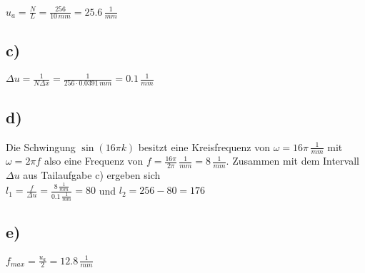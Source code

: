 \documentclass[a4paper,11pt,oneside]{scrartcl}
\begin{document}
$u_{a}=\frac{N}{L}=\frac{256}{10\,mm}=25.6\,\frac{1}{mm}$

\subsection*{c)}

$\Delta u=\frac{1}{N\Delta x}=\frac{1}{256\cdot0.0391\,mm}= 0.1\,\frac{1}{mm}$

\subsection*{d)}

Die Schwingung $\sin(16\pi k)$ besitzt eine Kreisfrequenz von $\omega=16\pi\,\frac{1}{mm}$ mit $\omega=2\pi f$ also eine Frequenz von $f=\frac{16\pi}{2\pi}\,\frac{1}{mm}=8\,\frac{1}{mm}$. Zusammen mit dem Intervall $\Delta u$ aus Tailaufgabe c) ergeben sich \\

$l_{1}=\frac{f}{\Delta u}=\frac{8\,\frac{1}{mm}}{0.1\,\frac{1}{mm}}=80$ und $l_{2}=256-80=176$

\subsection*{e)}

$f_{max}=\frac{u_{a}}{2}=12.8\,\frac{1}{mm}$
\end{document}
